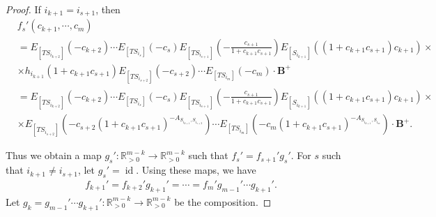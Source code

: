 \documentclass[12pt]{amsart}
\begin{document}
\begin{proof}
    If $i_{k+1}=i_{s+1}$, then 
    \begin{align*}
        &f_s'(c_{k+1},\cdots,c_m)\\
        &=E_{[TS_{i_{k+2}}]}(-c_{k+2})\cdots E_{[TS_{i_{s}}]}(-c_s) E_{[TS_{i_{s+1}}]}(-\frac{c_{s+1}}{1+c_{k+1}c_{s+1}}) E_{[S_{i_{k+1}}]}((1+c_{k+1}c_{s+1})c_{k+1}) \times \\
        &\times h_{i_{k+1}}(1+c_{k+1}c_{s+1}) E_{[TS_{i_{s+2}}]}(-c_{s+2})\cdots E_{[TS_{i_m}]}(-c_m)\cdot \mathbf{B}^+\\
        &=E_{[TS_{i_{k+2}}]}(-c_{k+2})\cdots E_{[TS_{i_{s}}]}(-c_s) E_{[TS_{i_{s+1}}]}(-\frac{c_{s+1}}{1+c_{k+1}c_{s+1}}) E_{[S_{i_{k+1}}]}((1+c_{k+1}c_{s+1})c_{k+1})\times \\
        &\times E_{[TS_{i_{s+2}}]}(-c_{s+2}(1+c_{k+1}c_{s+1})^{-A_{S_{i_{k+1}},S_{i_{s+2}}}})\cdots E_{[TS_{i_m}]}(-c_m(1+c_{k+1}c_{s+1})^{-A_{S_{i_{k+1}},S_{i_m}}})\cdot \mathbf{B}^+.
    \end{align*}

    Thus we obtain a map $g_s':\mathbb{R}_{>0}^{m-k}\rightarrow \mathbb{R}_{>0}^{m-k}$ such that $f_s'=f_{s+1}'g_s'$.
    For $s$ such that $i_{k+1}\neq i_{s+1}$, let $g_s'=\operatorname{id}$.
    Using these maps, we have 
    \begin{align*}
        f_{k+1}'=f_{k+2}'g_{k+1}'=\cdots=f_m'g_{m-1}'\cdots g_{k+1}'.
    \end{align*}
    Let $g_k=g_{m-1}'\cdots g_{k+1}':\mathbb{R}_{>0}^{m-k}\rightarrow \mathbb{R}_{>0}^{m-k}$ be the composition.


\end{proof}
\end{document}
